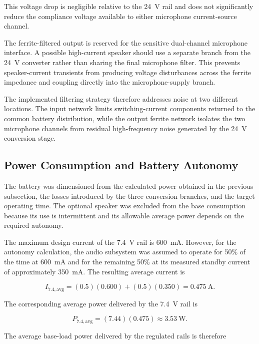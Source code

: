 This voltage drop is negligible relative to the 24~V rail and does not significantly reduce the compliance voltage available to either microphone current-source channel.

The ferrite-filtered output is reserved for the sensitive dual-channel microphone interface. A possible high-current speaker should use a separate branch from the 24~V converter rather than sharing the final microphone filter. This prevents speaker-current transients from producing voltage disturbances across the ferrite impedance and coupling directly into the microphone-supply branch.

The implemented filtering strategy therefore addresses noise at two different locations. The input network limits switching-current components returned to the common battery distribution, while the output ferrite network isolates the two microphone channels from residual high-frequency noise generated by the 24~V conversion stage.

\subsection{Power Consumption and Battery Autonomy}
\label{sec:power_consumption_autonomy}

The battery was dimensioned from the calculated power obtained in the previous subsection, the losses introduced by the three conversion branches, and the target operating time. The optional speaker was excluded from the base consumption because its use is intermittent and its allowable average power depends on the required autonomy.

The maximum design current of the 7.4~V rail is 600~mA. However, for the autonomy calculation, the audio subsystem was assumed to operate for 50\% of the time at 600~mA and for the remaining 50\% at its measured standby current of approximately 350~mA. The resulting average current is

\begin{equation}
I_{7.4,\mathrm{avg}}
=
(0.5)(0.600)
+
(0.5)(0.350)
=
0.475~\mathrm{A}.
\end{equation}

The corresponding average power delivered by the 7.4~V rail is

\begin{equation}
P_{7.4,\mathrm{avg}}
=
(7.44)(0.475)
\approx
3.53~\mathrm{W}.
\end{equation}

The average base-load power delivered by the regulated rails is therefore

